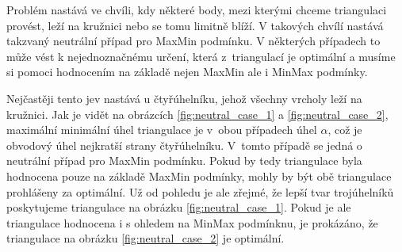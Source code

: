 \documentclass[12pt,a4paper]{article}
\begin{document}
Problém nastává ve chvíli, kdy některé body, mezi kterými chceme
triangulaci provést, leží na kružnici nebo se tomu limitně blíží. V
takových chvílí nastává takzvaný neutrální případ pro MaxMin
podmínku. V některých případech to může vést k nejednoznačnému určení,
která z~triangulací je optimální a musíme si pomoci hodnocením na
základě nejen MaxMin ale i MinMax podmínky.

\begin{figure}[h!]
\centering
\begin{floatrow}
\end{floatrow}
\end{figure}


Nejčastěji tento jev nastává u čtyřúhelníku, jehož všechny vrcholy
leží na kružnici. Jak je vidět na obrázcích \ref{fig:neutral_case_1} a
\ref{fig:neutral_case_2}, maximální minimální úhel triangulace je
v~obou případech úhel $\alpha$, což je obvodový úhel nejkratší strany
čtyřúhelníku. V~tomto případě se jedná o neutrální případ pro MaxMin
podmínku. Pokud by tedy triangulace byla hodnocena pouze na základě
MaxMin podmínky, mohly by být obě triangulace prohlášeny za
optimální. Už od pohledu je ale zřejmé, že lepší tvar trojúhelníků
poskytujeme triangulace na obrázku \ref{fig:neutral_case_1}. Pokud je
ale triangulace hodnocena i s ohledem na MinMax podmínknu, je
prokázáno, že triangulace na obrázku \ref{fig:neutral_case_2} je
optimální.
\end{document}
